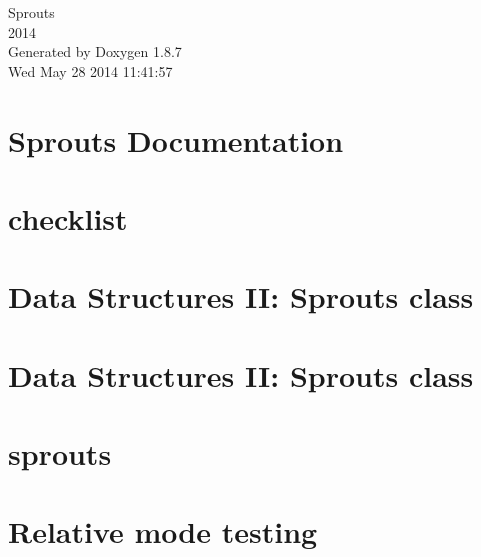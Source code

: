 \documentclass[twoside]{book}
\newcommand{\+}{\discretionary{\mbox{\scriptsize$\hookleftarrow$}}{}{}}
\newcommand{\clearemptydoublepage}{%
  \newpage{\pagestyle{empty}\cleardoublepage}%
}
\begin{document}
\hypersetup{pageanchor=false,
             bookmarks=true,
             bookmarksnumbered=true,
             pdfencoding=unicode
            }
\begin{titlepage}
\vspace*{7cm}
\begin{center}%
{\Large Sprouts \\[1ex]\large 2014 }\\
\vspace*{1cm}
{\large Generated by Doxygen 1.8.7}\\
\vspace*{0.5cm}
{\small Wed May 28 2014 11:41:57}\\
\end{center}
\end{titlepage}
\clearemptydoublepage
\tableofcontents
\clearemptydoublepage
{}
\hypersetup{pageanchor=true}

\chapter{Sprouts Documentation}
\label{index}\hypertarget{index}{}
\chapter{checklist}
\label{md_checklist}
\hypertarget{md_checklist}{}

\chapter{Data Structures I\+I\+: Sprouts class}
\label{md_docs_04-24-2014}
\hypertarget{md_docs_04-24-2014}{}

\chapter{Data Structures I\+I\+: Sprouts class}
\label{md_docs_04-28-2014}
\hypertarget{md_docs_04-28-2014}{}

\chapter{sprouts}
\label{md_README}
\hypertarget{md_README}{}

\chapter{Relative mode testing}
\label{md_SDL2-2_80_83_test_relative_mode}
\hypertarget{md_SDL2-2_80_83_test_relative_mode}{}

\end{document}
